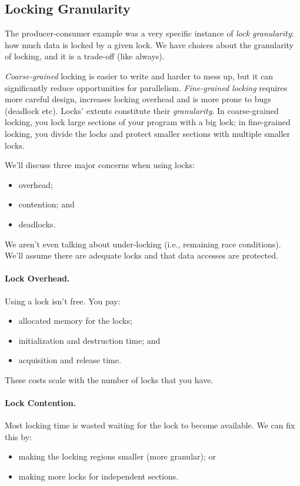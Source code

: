 \documentclass[a4paper]{report}
\begin{document}
\subsection*{Locking Granularity}

The producer-consumer example was a very specific instance of \textit{lock granularity}: how much data is locked by a given lock. We have choices about the granularity of locking, and it is a trade-off (like always).

\textit{Coarse-grained} locking is easier to write and harder to mess up, but it can significantly reduce opportunities for parallelism. \textit{
Fine-grained locking} requires more careful design,
increases locking overhead and is more prone to bugs (deadlock etc).
Locks' extents constitute their {\it granularity}. In coarse-grained locking, you
lock large sections of your program with a big lock; in fine-grained
locking, you divide the locks and protect smaller sections with multiple smaller locks.

We'll discuss three major concerns when using locks:
  \begin{itemize}
    \item overhead;
    \item contention; and
    \item deadlocks.
  \end{itemize}
We aren't even talking about under-locking (i.e., remaining race conditions). We'll assume there are adequate locks and that data accesses are protected.

\paragraph{Lock Overhead.}
  Using a lock isn't free. You pay:
  \begin{itemize}
    \item allocated memory for the locks;
    \item initialization and destruction time; and
    \item acquisition and release time.
  \end{itemize}
  These costs scale with the number of locks that you have.

\paragraph{Lock Contention.}
 Most locking time is wasted waiting for the lock to become available.
We can fix this by:
      \begin{itemize}
        \item making the locking regions smaller (more granular); or
        \item making more locks for independent sections.
      \end{itemize}
\end{document}
